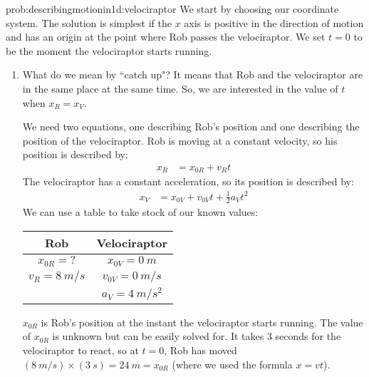 \newpage
\begin{solution}{prob:describingmotionin1d:velociraptor}\label{soln:describingmotionin1d:velociraptor}
We start by choosing our coordinate system. The solution is simplest if the $x$ axis is positive in the direction of motion and has an origin at the point where Rob passes the velociraptor. We set $t=0$ to be the moment the velociraptor starts running.\\


\begin{enumerate}[label=(\alph*)]
\item What do we mean by ``catch up"? It means that Rob and the velociraptor are in the same place at the same time. So, we are interested in the value of $t$ when $x_R=x_V$. 

We need two equations, one describing Rob's position and one describing the position of the velociraptor. Rob is moving at a constant velocity, so his position is described by:
\begin{align*}
x_R&=x_{0R}+v_{R}t
\end{align*}
The velociraptor has a constant acceleration, so its position is described by:
\begin{align*}
x_V&=x_{0V}+v_{0V}t+\frac{1}{2}a_Vt^2
\end{align*}
We can use a table to take stock of our known values:
\begin{table}[H]
\centering
\label{KnownsUnknownsSampleProb1D}
\begin{tabular}{|c|c|}
\hline
\textbf{Rob}          & \textbf{Velociraptor}  \\ \hline
$x_{0R} = ?$          & $x_{0V} = \SI{0}{m}$   \\
$v_R = \SI{8}{m/s}$   & $v_{0V} = \SI{0}{m/s}$ \\
                   & $a_V = \SI{4}{m/s^2}$  \\                                     
\end{tabular}
\end{table}

$x_{0R}$ is Rob's position at the instant the velociraptor starts running. The value of $x_{0R}$ is unknown but can be easily solved for. It takes 3 seconds for the velociraptor to react, so at $t=0$, Rob has moved $(\SI{8}{m/s})\times (\SI{3}{s}) = \SI{24}{m} = x_{0R}$ (where we used the formula $x=vt$).\\


\end{enumerate}
\end{solution}
